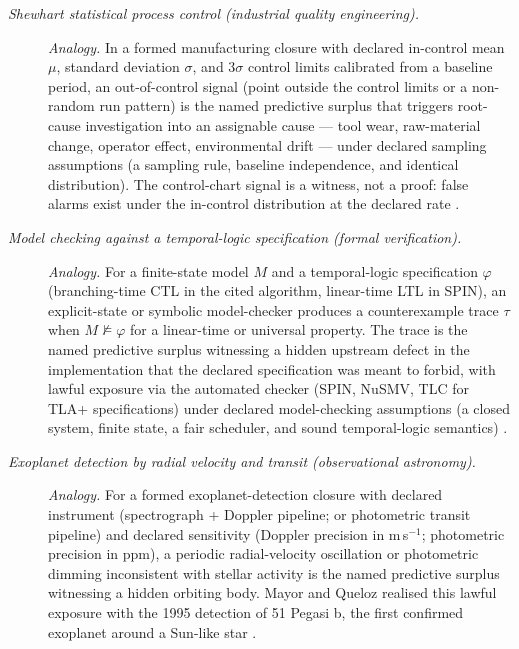 \begin{description}
\item[\emph{Shewhart statistical process control (industrial
quality engineering).}] \textit{Analogy.}
In a formed manufacturing closure with declared in-control mean
\(\mu\), standard deviation \(\sigma\), and \(3\sigma\) control
limits calibrated from a baseline period, an out-of-control signal
(point outside the control limits or a non-random run pattern) is
the named predictive surplus that triggers root-cause investigation
into an assignable cause --- tool wear, raw-material change,
operator effect, environmental drift --- under declared sampling
assumptions (a sampling rule, baseline independence, and identical
distribution).  The control-chart signal is a witness, not
a proof: false alarms exist under the in-control distribution at the
declared rate
\citep{Shewhart1931EconomicControl}.

\item[\emph{Model checking against a temporal-logic specification
(formal verification).}] \textit{Analogy.}
For a finite-state model \(M\) and a temporal-logic
specification \(\varphi\) (branching-time CTL in the cited algorithm,
linear-time LTL in SPIN), an explicit-state or symbolic
model-checker produces a counterexample trace \(\tau\) when
\(M\not\models\varphi\) for a linear-time or universal property.  The trace is the named predictive surplus
witnessing a hidden upstream defect in the implementation that the
declared specification was meant to forbid, with lawful exposure via
the automated checker (SPIN, NuSMV, TLC for TLA+ specifications)
under declared model-checking assumptions (a closed system, finite
state, a fair scheduler, and sound temporal-logic semantics)
\citep{ClarkeEmersonSistla1986AutomaticVerification}.

\item[\emph{Exoplanet detection by radial velocity and transit
(observational astronomy).}] \textit{Analogy.}
For a formed exoplanet-detection closure with declared instrument
(spectrograph + Doppler pipeline; or photometric transit pipeline)
and declared sensitivity (Doppler precision in m\,s\(^{-1}\);
photometric precision in ppm), a periodic radial-velocity
oscillation or photometric dimming inconsistent with stellar
activity is the named predictive surplus witnessing a hidden
orbiting body.  Mayor and Queloz realised this lawful exposure with
the 1995 detection of 51 Pegasi b, the first confirmed exoplanet
around a Sun-like star
\citep{MayorQueloz199551Pegasi}.


\end{description}

